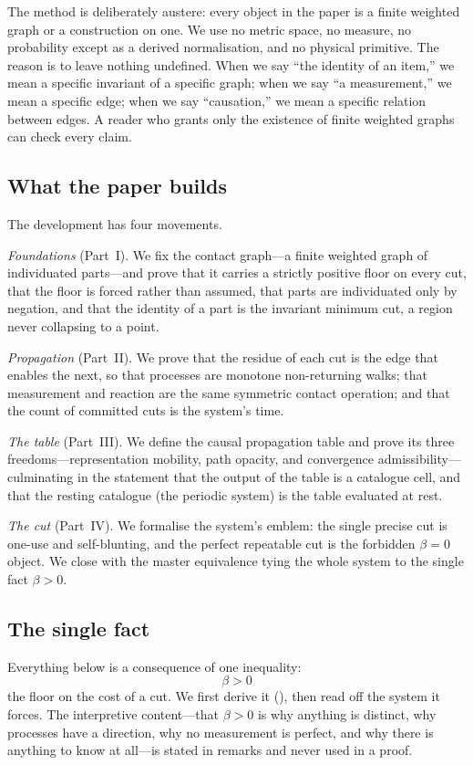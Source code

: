 \documentclass[11pt,a4paper]{article}
\theoremstyle{thmstyle}
\theoremstyle{definition}
\theoremstyle{remark}
\newcommand{\flo}{\beta}                 %
\begin{document}
The method is deliberately austere: every object in the paper is a finite
weighted graph or a construction on one. We use no metric space, no
measure, no probability except as a derived normalisation, and no physical
primitive. The reason is to leave nothing undefined. When we say ``the
identity of an item,'' we mean a specific invariant of a specific graph;
when we say ``a measurement,'' we mean a specific edge; when we say
``causation,'' we mean a specific relation between edges. A reader who
grants only the existence of finite weighted graphs can check every claim.

\subsection{What the paper builds}

The development has four movements.

\emph{Foundations} (Part~I). We fix the contact graph---a finite weighted
graph of individuated parts---and prove that it carries a strictly
positive floor on every cut, that the floor is forced rather than assumed,
that parts are individuated only by negation, and that the identity of a
part is the invariant minimum cut, a region never collapsing to a point.

\emph{Propagation} (Part~II). We prove that the residue of each cut is the
edge that enables the next, so that processes are monotone non-returning
walks; that measurement and reaction are the same symmetric contact
operation; and that the count of committed cuts is the system's time.

\emph{The table} (Part~III). We define the causal propagation table and
prove its three freedoms---representation mobility, path opacity, and
convergence admissibility---culminating in the statement that the
output of the table is a catalogue cell, and that the resting catalogue
(the periodic system) is the table evaluated at rest.

\emph{The cut} (Part~IV). We formalise the system's emblem: the single
precise cut is one-use and self-blunting, and the perfect repeatable cut
is the forbidden $\flo=0$ object. We close with the master equivalence
tying the whole system to the single fact $\flo>0$.

\subsection{The single fact}

Everything below is a consequence of one inequality:
\[
\boxed{\ \flo>0\ }
\]
the floor on the cost of a cut. We first derive it (),
then read off the system it forces. The interpretive content---that
$\flo>0$ is why anything is distinct, why processes have a direction, why
no measurement is perfect, and why there is anything to know at all---is
stated in remarks and never used in a proof.
\end{document}
